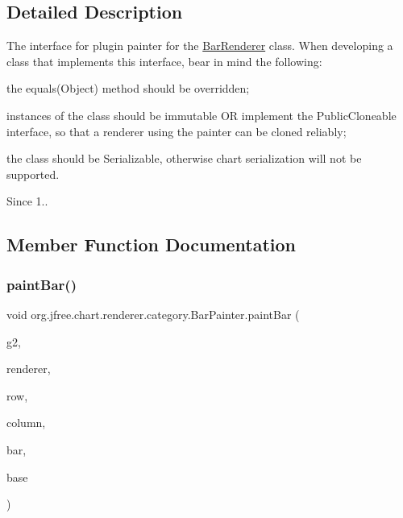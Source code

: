 \subsection{Detailed Description}
The interface for plugin painter for the \mbox{\hyperlink{classorg_1_1jfree_1_1chart_1_1renderer_1_1category_1_1_bar_renderer}{Bar\+Renderer}} class. When developing a class that implements this interface, bear in mind the following\+: 
\begin{DoxyItemize}
\item the {\ttfamily equals(\+Object)} method should be overridden; 
\item instances of the class should be immutable OR implement the {\ttfamily Public\+Cloneable} interface, so that a renderer using the painter can be cloned reliably; 
\item the class should be {\ttfamily Serializable}, otherwise chart serialization will not be supported. 
\end{DoxyItemize}

\begin{DoxySince}{Since}
1.. 
\end{DoxySince}


\subsection{Member Function Documentation}
\mbox{\label{interfaceorg_1_1jfree_1_1chart_1_1renderer_1_1category_1_1_bar_painter_af5a3c8984af0bc1a4ba94c830048193a}} 
\subsubsection{\texorpdfstring{paint\+Bar()}{paintBar()}}
{\footnotesize\ttfamily void org.\+jfree.\+chart.\+renderer.\+category.\+Bar\+Painter.\+paint\+Bar (\begin{DoxyParamCaption}\item[{Graphics2D}]{g2,  }\item[{\mbox{\hyperlink{classorg_1_1jfree_1_1chart_1_1renderer_1_1category_1_1_bar_renderer}{Bar\+Renderer}}}]{renderer,  }\item[{int}]{row,  }\item[{int}]{column,  }\item[{Rectangular\+Shape}]{bar,  }\item[{Rectangle\+Edge}]{base }\end{DoxyParamCaption})}

